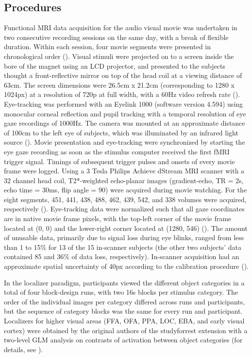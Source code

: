 \documentclass[a4paper, 12pt]{scrreprt}
\begin{document}
\subsection{Procedures}
Functional MRI data acquisition for the audio visual movie was undertaken in two consecutive recording sessions on the same day, with a break of flexible duration. Within each session, four movie segments were presented in chronological order (\cite{hanke2016studyforrest}). Visual stimuli were projected on to a screen inside the bore of the magnet using an LCD projector, and presented to the subjects thought a front-reflective mirror on top of the head coil at a viewing distance of 63cm. The screen dimensions were 26.5cm x 21.2cm (corresponding to 1280 x 1024px) at a resolution of 720p at full width, with a 60Hz video refresh rate (\cite{sengupta2016studyforrest}). Eye-tracking was performed with an Eyelink 1000 (software version 4.594) using monocular corneal reflection and pupil tracking with a temporal resolution of eye gaze recordings of 1000Hz. The camera was mounted at an approximate distance of 100cm to the left eye of subjects, which was illuminated by an infrared light source (\cite{hanke2016studyforrest}). Movie presentation and eye-tracking were synchronized by starting the eye gaze recording as soon as the stimulus computer received the first fMRI trigger signal. Timings of subsequent trigger pulses and onsets of every movie frame were logged. Using a 3 Tesla Philips Achieve dStream MRI scanner with a 32 channel head coil, T2*-weighted echo-planar images (gradient-echo, TR = 2s, echo time = 30ms, flip angle = 90) were acquired during movie watching. For the eight segments, 451, 441, 438, 488, 462, 439, 542, and 338 volumes were acquired, respectively (\cite{hanke2016studyforrest}). Eye-tracking data were normalized such that all gaze coordinates are in native movie frame pixels, with the top-left corner of the movie frame located at (0, 0) and the lower-right corner located at (1280, 546) (\cite{hanke2016studyforrest}). The amount of unusable data, primarily due to signal loss during eye blinks, ranged from less than 1 to 15\% for 13 of the 15 in-scanner subjects (the other two subjects’ data contained 85 and 36\% of data loss, respectively). In-scanner acquisition had an approximate spatial uncertainty of 40px according to the calibration procedure (\cite{hanke2016studyforrest}).\newline

In the localizer paradigm, participants viewed the different object categories in a total of four block-design runs, with two 16s blocks per stimulus category. The order of the individual images per category differed across runs and participants, but the sequence of category blocks was the same for every run and participant. Localizers for higher visual areas (FFA, OFA, PPA, LOC, EBA, and early visual cortex) were obtained by the original authors of the studyforrest extension with a two-level GLM analysis on contrasts of activation between object categories (for details, see \cite{sengupta2016studyforrest}).
\end{document}
